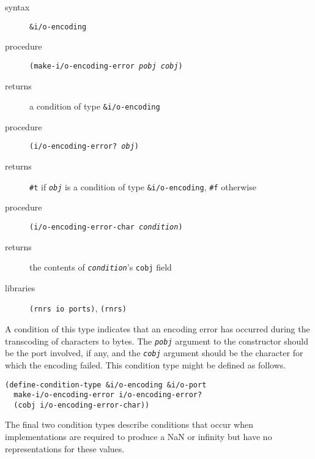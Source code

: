 \begin{description}

\label{exceptions_s43}\item[syntax] \texttt{\&{}i/o-encoding}



\item[procedure] \texttt{(make-i/o-encoding-error \textit{pobj} \textit{cobj})}



\item[returns] a condition of type \texttt{\&{}i/o-encoding}


\item[procedure] \texttt{(i/o-encoding-error? \textit{obj})}



\item[returns] \texttt{\#{}t} if \texttt{\textit{obj}} is a condition of type \texttt{\&{}i/o-encoding}, \texttt{\#{}f} otherwise


\item[procedure] \texttt{(i/o-encoding-error-char \textit{condition})}



\item[returns] the contents of \texttt{\textit{condition}}'s \texttt{cobj} field


\item[libraries] \texttt{(rnrs io ports)}, \texttt{(rnrs)}
\end{description}



A condition of this type indicates that an encoding error has occurred
during the transcoding of characters to bytes.
The \texttt{\textit{pobj}} argument to the constructor should be the
port involved, if any, and the \texttt{\textit{cobj}} argument should be the character for
which the encoding failed.
This condition type might be defined as follows.

\begin{alltt}
(define-condition-type \&{}i/o-encoding \&{}i/o-port
  make-i/o-encoding-error i/o-encoding-error?
  (cobj i/o-encoding-error-char))
\end{alltt}


The final two condition types describe conditions that occur when
implementations are required to produce a NaN or infinity but have
no representations for these values.

